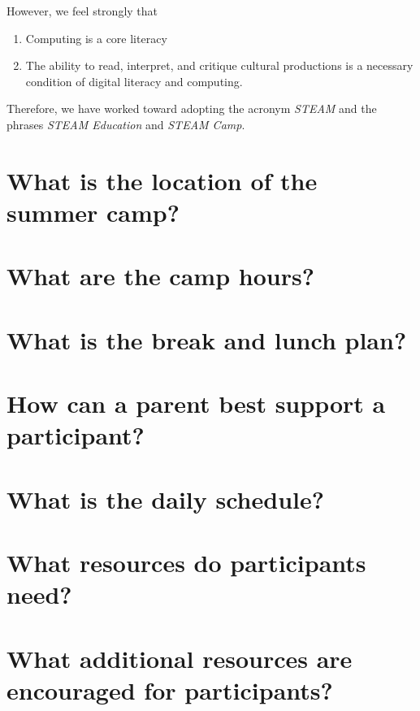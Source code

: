 \documentclass[letterpaper,10pt,english]{sphinxmanual}
\begin{document}
However, we feel strongly that
\begin{enumerate}
\item {} 
Computing is a core literacy

\item {} 
The ability to read, interpret, and critique cultural productions is a necessary condition of digital literacy and computing.

\end{enumerate}

Therefore, we have worked toward adopting the acronym \emph{STEAM} and the phrases \emph{STEAM Education} and \emph{STEAM Camp}.


\section{What is the location of the summer camp?}
\label{faq:what-is-the-location-of-the-summer-camp}

\section{What are the camp hours?}
\label{faq:what-are-the-camp-hours}

\section{What is the break and lunch plan?}
\label{faq:what-is-the-break-and-lunch-plan}

\section{How can a parent best support a participant?}
\label{faq:how-can-a-parent-best-support-a-participant}

\section{What is the daily schedule?}
\label{faq:what-is-the-daily-schedule}

\section{What resources do participants need?}
\label{faq:what-resources-do-participants-need}

\section{What additional resources are encouraged for participants?}
\label{faq:what-additional-resources-are-encouraged-for-participants}
\end{document}
